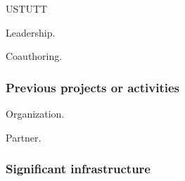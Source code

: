 \begin{sitedescription}{USTUTT}
\begin{compactenum}
\item Leadership.
\item Coauthoring.
\end{compactenum}

\subsubsection*{Previous projects or activities}

\begin{compactenum}
\item Organization.
\item Partner.
\end{compactenum}

\subsubsection*{Significant infrastructure}

\end{sitedescription}
